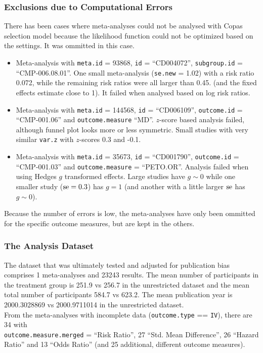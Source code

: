 \documentclass[11pt,a4paper,twoside]{book}\usepackage[]{graphicx}\usepackage[]{color}
\begin{document}
\subsubsection{Exclusions due to Computational Errors}
There has been cases where meta-analyses could not be analysed with Copas selection model because the likelihood function could not be optimized based on the settings. It was ommitted in this case.\\
\begin{itemize}
\item Meta-analysis with \texttt{meta.id} = 93868,  \texttt{id} = ``CD004072'', \texttt{subgroup.id} = ``CMP-006.08.01''. One small meta-analysis (\texttt{se.new} = 1.02) with a risk ratio 0.072, while the remaining risk ratios were all larger than 0.45. (and the fixed effects estimate close to 1). It failed when analysed based on log risk ratios.
\item Meta-analysis with \texttt{meta.id} = 144568,  \texttt{id} = ``CD006109'', \texttt{outcome.id} = ``CMP-001.06'' and \texttt{outcome.measure} ``MD''. $z$-score based analysis failed, although funnel plot looks more or less symmetric. Small studies with very similar \texttt{var.z} with $z$-scores 0.3 and -0.1.
\item Meta-analysis with \texttt{meta.id} = 35673,  \texttt{id} = ``CD001790'', \texttt{outcome.id} = ``CMP-001.03'' and \texttt{outcome.measure} = ``PETO.OR''. Analysis failed when using Hedges $g$ transformed effects. Large studies have $g \sim 0$ while one smaller study ($\operatorname{se} = 0.3$) has $g = 1$ (and another with a little larger $\operatorname{se}$ has $g \sim 0$).
\end{itemize}
Because the number of errors is low, the meta-analyses have only been ommitted for the specific outcome measures, but are kept in the others. 

\subsubsection{The Analysis Dataset}
The dataset that was ultimately tested and adjusted for publication bias comprises 1 meta-analyses and 23243 results. The mean number of participants in the treatment group is 251.9 vs 256.7 in the unrestricted dataset and the mean total number of participants 584.7 vs 623.2. The mean publication year is 2000.3028869 vs 2000.9711014 in the unrestricted dataset. \\
From the meta-analyses with incomplete data (\texttt{outcome.type} == \texttt{IV}), there are 34 with \\ \texttt{outcome.measure.merged} = ``Risk Ratio'', 27 ``Std. Mean Difference'',  26 ``Hazard Ratio'' and 13 ``Odds Ratio'' (and 25 additional, different outcome measures).
\end{document}
